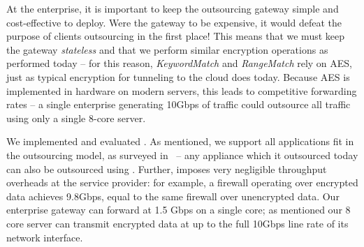   At the enterprise, it is important to keep the outsourcing gateway simple and cost-effective to deploy.
  Were the gateway to be expensive, it would defeat the purpose of clients outsourcing in the first place! 
  This means that we must keep the gateway {\it stateless} and that we perform similar encryption operations as performed today -- for this reason, {\it KeywordMatch} and {\it RangeMatch} rely on AES, just as typical encryption for tunneling to the cloud does today. 
  Because AES is implemented in hardware on modern servers, this leads to competitive forwarding rates -- a single enterprise generating 10Gbps of traffic could outsource all traffic using only a single 8-core server.


We implemented and evaluated \sys. As mentioned, we support all applications fit in the outsourcing model, as surveyed in~\cite{aplomb} -- any appliance which it outsourced today can also be outsourced using \sys.
Further, \sys imposes very negligible throughput overheads at the service provider: for example, a firewall operating over encrypted data achieves 9.8Gbps, equal to the same firewall over unencrypted data.
Our enterprise gateway can forward at 1.5 Gbps on a single core; as mentioned our 8 core server can transmit \sys encrypted data at up to the full 10Gbps line rate of its network interface.
